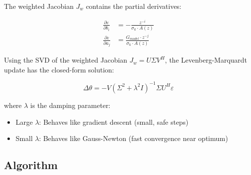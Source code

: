 The weighted Jacobian $J_w$ contains the partial derivatives:

\begin{align}
    \frac{\partial \varepsilon}{\partial b_i} &= -\frac{z^{-i}}{\sigma_k \cdot A(z)} \\
    \frac{\partial \varepsilon}{\partial a_j} &= \frac{G_{model} \cdot z^{-j}}{\sigma_k \cdot A(z)}
\end{align}

Using the SVD of the weighted Jacobian $J_w = U \Sigma V^H$, the Levenberg-Marquardt update has the closed-form solution:

\begin{equation}
    \Delta\theta = -V \left(\Sigma^2 + \lambda^2 I\right)^{-1} \Sigma U^H \varepsilon
\end{equation}

where $\lambda$ is the damping parameter:
\begin{itemize}
    \item Large $\lambda$: Behaves like gradient descent (small, safe steps)
    \item Small $\lambda$: Behaves like Gauss-Newton (fast convergence near optimum)
\end{itemize}

\subsection{Algorithm}

